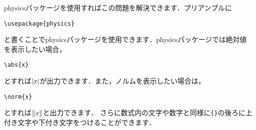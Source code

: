 \documentclass[a4paper,11pt,titlepage]{jsarticle}
\theoremstyle{definition}
\begin{document}
physicsパッケージを使用すればこの問題を解決できます．プリアンプルに
\begin{center}
    \verb|\usepackage{physics}|
\end{center}
と書くことでphysicsパッケージを使用できます．physicsパッケージでは絶対値を表示したい場合，
\begin{center}
    \verb|\abs{x}|
\end{center}
とすれば$\abs{x}$が出力できます．また，ノルムを表示したい場合は，
\begin{center}
    \verb|\norm{x}|
\end{center}
とすれば$\norm{x}$と出力できます．
さらに数式内の文字や数字と同様に\verb|{}|の後ろに上付き文字や下付き文字をつけることができます．
\end{document}
